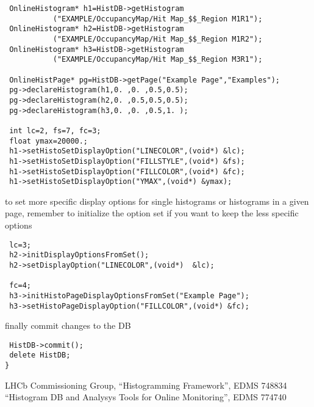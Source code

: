 \documentclass{lhcbnote}
\begin{document}
\begin{verbatim}
 OnlineHistogram* h1=HistDB->getHistogram
           ("EXAMPLE/OccupancyMap/Hit Map_$$_Region M1R1");
 OnlineHistogram* h2=HistDB->getHistogram
           ("EXAMPLE/OccupancyMap/Hit Map_$$_Region M1R2");
 OnlineHistogram* h3=HistDB->getHistogram
           ("EXAMPLE/OccupancyMap/Hit Map_$$_Region M3R1");

 OnlineHistPage* pg=HistDB->getPage("Example Page","Examples");
 pg->declareHistogram(h1,0. ,0. ,0.5,0.5);
 pg->declareHistogram(h2,0. ,0.5,0.5,0.5);
 pg->declareHistogram(h3,0. ,0. ,0.5,1. );

 int lc=2, fs=7, fc=3;
 float ymax=20000.;
 h1->setHistoSetDisplayOption("LINECOLOR",(void*) &lc);
 h1->setHistoSetDisplayOption("FILLSTYLE",(void*) &fs);
 h1->setHistoSetDisplayOption("FILLCOLOR",(void*) &fc); 
 h1->setHistoSetDisplayOption("YMAX",(void*) &ymax); 
 \end{verbatim}
to set more specific display options for single histograms or
histograms in a given page, remember to initialize the option set if
you want to keep the less specific options
\begin{verbatim}
 lc=3;
 h2->initDisplayOptionsFromSet();
 h2->setDisplayOption("LINECOLOR",(void*)  &lc);

 fc=4;
 h3->initHistoPageDisplayOptionsFromSet("Example Page");
 h3->setHistoPageDisplayOption("FILLCOLOR",(void*) &fc);
\end{verbatim}
finally commit changes to the DB
\begin{verbatim}
 HistDB->commit();
 delete HistDB;
}
\end{verbatim}


\begin{thebibliography}{99}
LHCb Commissioning Group, ``Histogramming Framework'', EDMS 748834
``Histogram DB and Analysys Tools for Online Monitoring'', EDMS 774740

\end{thebibliography}
\end{document}
